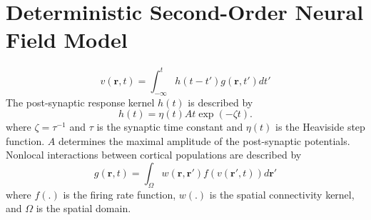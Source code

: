 \documentclass[a4paper,10pt]{article}
\begin{document}
\section{Deterministic Second-Order Neural Field Model}
\begin{equation}\label{SpikesToPotential}
	v\left( {\mathbf{r},t} \right) = \int_{ - \infty }^t {h\left( {t - t'}
\right)g\left( {\mathbf{r},t'} \right)dt'}
\end{equation}
The post-synaptic response kernel $h(t)$ is described by
\begin{equation}\label{SynapticRespKernel}
	h(t) = \eta(t)At\exp{\left(-\zeta t\right)}.
\end{equation}
where $\zeta=\tau^{-1}$ and $\tau$ is the synaptic time constant and $\eta(t)$
is the Heaviside step function. $A$ determines the maximal amplitude of the
post-synaptic potentials.
Nonlocal interactions between cortical populations are described by	
\begin{equation}\label{RateBasedInteractions}
	g\left( \mathbf{r},t \right) = \int_\Omega  {w\left(
\mathbf{r},\mathbf{r}' \right)f\left( v\left( \mathbf{r}',t \right)
\right)d\mathbf{r}'} 
\end{equation}
where $f(.)$ is the firing rate function, $w(.)$ is the spatial connectivity
kernel, and $\Omega$ is the spatial domain.
\end{document}
